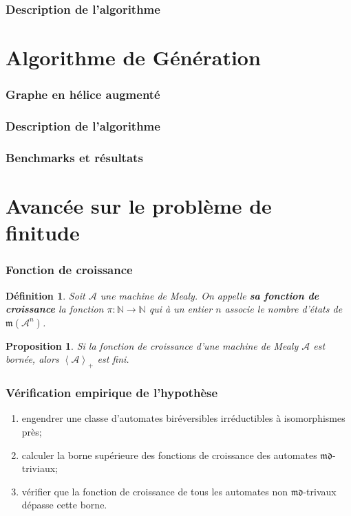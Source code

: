 \documentclass[11pt]{beamer}
\newtheorem{prop}{Proposition}
\newtheorem{defi}{Définition}
\begin{document}
	\begin{frame}
		\frametitle{Description de l'algorithme}
	\end{frame}

	\section{Algorithme de Génération}
	
	\begin{frame}
		\frametitle{Graphe en hélice augmenté}
	\end{frame}

	\begin{frame}
		\frametitle{Description de l'algorithme}
	\end{frame}

	\begin{frame}
		\frametitle{Benchmarks et résultats}
	\end{frame}

	\section{Avancée sur le problème de finitude}
	
	\begin{frame}
		\frametitle{Fonction de croissance}
		
		\begin{defi} \label{def:mass}
			Soit $\mathcal{A}$ une machine de Mealy. On appelle \textbf{\textit{sa fonction de croissance}} la fonction $\pi:\mathbb{N}\rightarrow\mathbb{N}$ qui à un entier $n$ associe le nombre d'états de~$\mathfrak{m}\left(\mathcal{A}^n\right)$.
		\end{defi}
		
		\begin{prop} \label{prop:mass}
			Si la fonction de croissance d'une machine de Mealy $\mathcal{A}$ est bornée, alors $\left<\mathcal{A}\right>_+$ est fini.
		\end{prop}
	\end{frame}

	\begin{frame}
		\frametitle{Vérification empirique de l'hypothèse}
		
		\begin{enumerate}
			\item engendrer une classe d'automates biréversibles irréductibles à isomorphismes près;
			\item calculer la borne supérieure des fonctions de croissance des automates $\mathfrak{md}$-triviaux;
			\item vérifier que la fonction de croissance de tous les automates non $\mathfrak{md}$-trivaux dépasse cette borne.
		\end{enumerate}
	\end{frame}
\end{document}
